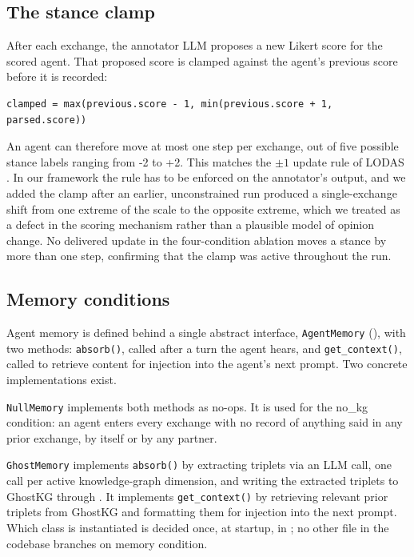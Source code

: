 \documentclass[11pt,a4paper]{article}
\newcommand{\cond}[1]{\textsf{#1}}
\begin{document}
\subsection{The stance clamp}\label{sec:3.2}

After each exchange, the annotator LLM proposes a new Likert score for the scored agent. That proposed score is clamped against the agent's previous score before it is recorded:

\begin{verbatim}
clamped = max(previous.score - 1, min(previous.score + 1, parsed.score))
\end{verbatim}

An agent can therefore move at most one step per exchange, out of five possible stance labels ranging from -2 to +2. This matches the $\pm 1$ update rule of LODAS \citep{cau2025selective}. In our framework the rule has to be enforced on the annotator's output, and we added the clamp after an earlier, unconstrained run produced a single-exchange shift from one extreme of the scale to the opposite extreme, which we treated as a defect in the scoring mechanism rather than a plausible model of opinion change. No delivered update in the four-condition ablation moves a stance by more than one step, confirming that the clamp was active throughout the run.

\subsection{Memory conditions}\label{sec:3.3}

Agent memory is defined behind a single abstract interface, \texttt{AgentMemory} (), with two methods: \texttt{absorb()}, called after a turn the agent hears, and \texttt{get\_context()}, called to retrieve content for injection into the agent's next prompt. Two concrete implementations exist.

\texttt{NullMemory} implements both methods as no-ops. It is used for the \cond{no\_kg} condition: an agent enters every exchange with no record of anything said in any prior exchange, by itself or by any partner.

\texttt{GhostMemory} implements \texttt{absorb()} by extracting triplets via an LLM call, one call per active knowledge-graph dimension, and writing the extracted triplets to GhostKG through . It implements \texttt{get\_context()} by retrieving relevant prior triplets from GhostKG and formatting them for injection into the next prompt. Which class is instantiated is decided once, at startup, in ; no other file in the codebase branches on memory condition.
\end{document}
